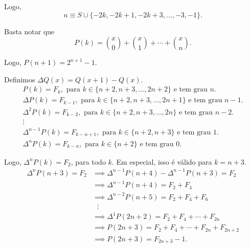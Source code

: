 \begin{sol}
		Logo, \[n \equiv S \cup \{-2k, -2k+1, -2k+3, \dots, -3, -1\}.\]

	\end{sol}

	\begin{sk}[para \nameref{P(k)=2^k}]
		Basta notar que \[
			P(k) = \binom{x}{0} + \binom{x}{1} + \cdots + \binom{x}{n}.
		\]

		Logo, $P(n+1) = 2^{n+1} - 1$.
	\end{sk}
	
	\begin{sk}[para \nameref{P(k)=F_k}]Definimos $\Delta Q(x) = Q(x+1) - Q(x)$.
		\begin{gather*}
			P(k) = F_k, \text{\ para\ } k \in \{n + 2, n+3, \dots, 2n+2\} \text{\ e tem grau\ }n.\\
			\Delta P(k) = F_{k-1}, \text{\ para\ } k \in \{n + 2, n+3, \dots, 2n+1\} \text{\ e tem grau\ }n - 1.\\
			\Delta^2 P(k) = F_{k-2}, \text{\ para\ } k \in \{n + 2, n+3, \dots, 2n\} \text{\ e tem grau\ }n - 2.\\
			\vdots\\
			\Delta^{n-1}P(k) = F_{k-n+1}, \text{\ para\ } k \in \{n + 2, n + 3\} \text{\ e tem grau\ }1.\\
			\Delta^{n}P(k) = F_{k-n}, \text{\ para\ } k \in \{n + 2\} \text{\ e tem grau\ }0.
		\end{gather*}

		Logo, $\Delta^n P(k) = F_{2}$, para todo $k$. Em especial, isso é válido para $k = n+3$.
		\begin{align*}
			\Delta^n P(n+3) = F_{2}	&\implies \Delta^{n-1} P(n+4) - \Delta^{n-1} P(n+3) = F_2\\
									&\implies \Delta^{n-1} P(n+4) = F_2 + F_4\\
									&\implies \Delta^{n-2} P(n+5) = F_2 + F_4 + F_6\\
									&\ \ \ \vdots\\
									&\implies \Delta^1 P(2n+2) = F_2 + F_4 + \cdots + F_{2n}\\
									&\implies P(2n+3) = F_2 + F_4 + \cdots + F_{2n} + F_{2n+2}\\
									&\implies P(2n+3) = F_{2n+3} - 1.
		\end{align*}
	\end{sk}


